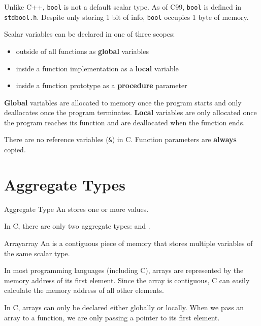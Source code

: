 \documentclass[code]{amznotes}
\begin{document}
Unlike C++, \texttt{bool} is not a default scalar type. As of C99, \texttt{bool} is defined in \texttt{stdbool.h}. Despite only storing 1 bit of info, \texttt{bool} occupies 1 byte of memory.


Scalar variables can be declared in one of three scopes:
\begin{itemize}
    \item outside of all functions as \textbf{global} variables
    \item inside a function implementation as a \textbf{local} variable
    \item inside a function prototype as a \textbf{procedure} parameter
\end{itemize}

\textbf{Global} variables are allocated to memory once the program starts and only deallocates once the program terminates. \textbf{Local} variables are only allocated once the program reaches its function and are deallocated when the function ends.

\begin{notebox}
    There are no reference variables (\texttt{\&}) in C. Function parameters are \textbf{always} copied.
\end{notebox}

\section{Aggregate Types}

\begin{dfnbox}{Aggregate Type}{}
    An  stores one or more values.
\end{dfnbox}

In C, there are only two aggregate types:  and .

\begin{dfnbox}{Array}{array}
    An  is a contiguous piece of memory that stores multiple variables of the same scalar type.
\end{dfnbox}

In most programming languages (including C), arrays are represented by the memory address of its first element. Since the array is contiguous, C can easily calculate the memory address of all other elements.


In C, arrays can only be declared either globally or locally. When we pass an array to a function, we are only passing a pointer to its first element.
\end{document}
